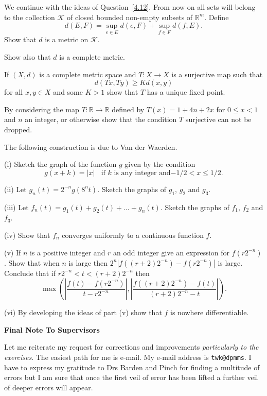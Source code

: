 \begin{question}
We continue with the ideas of Question~\ref{4.12}.
From now on all sets will belong to the collection
$\mathcal{K}$
of closed bounded non-empty subsets of ${\mathbb R}^{m}$.
Define
\[d(E,F)=\sup_{e\in E}d(e,F)+\sup_{f\in F}d(f,E).\]
Show that $d$ is a metric on $\mathcal{K}$.

Show also that $d$ is a complete metric.

\end{question}
\begin{question}\label{4.16} If $(X,d)$ is a complete metric
space and $T:X\rightarrow X$ is a surjective
map such that
\[d(Tx,Ty)\geq Kd(x,y)\]
for all $x,y\in X$ and some $K>1$ show that
$T$ has a unique fixed point.


By considering the map 
$T:{\mathbb R}\rightarrow{\mathbb R}$ defined by
$T(x)=1+4n+2x$ for $0\leq x<1$ and $n$ an integer,
or otherwise show that the condition $T$ surjective
can not be dropped.
\end{question}
\begin{question}
The following construction is due to Van der Waerden.

(i) Sketch the graph of the function $g$ given by the condition
\[g(x+k)=|x|\ \ \ \ \mbox{if $k$ is any integer and
$-1/2<x\leq 1/2$.}\]

(ii) Let $g_{n}(t)=2^{-n}g(8^{n}t)$. Sketch the graphs of
$g_{1}$, $g_{2}$ and $g_{3}$.

(iii) Let $f_{n}(t)=g_{1}(t)+g_{2}(t)+\ldots+g_{n}(t)$. Sketch the
graphs of $f_{1}$, $f_{2}$ and $f_{3}$.

(iv) Show that $f_{n}$ converges uniformly to a continuous function 
$f$.

(v) If $n$ is a positive integer and $r$ an odd integer give
an expression for $f(r2^{-n})$. Show that when $n$ is large
then $2^{n}|f((r+2)2^{-n})-f(r2^{-n})|$ is large.
Conclude that
if $r2^{-n}<t<(r+2)2^{-n}$ then
\[\max\left(\left|\frac{f(t)-f(r2^{-n})}{t-r2^{-n}}\right|,
\left|\frac{f((r+2)2^{-n})-f(t)}{(r+2)2^{-n}-t}\right|\right).\]

(vi) By developing the ideas of part (v) show that $f$ is
nowhere differentiable.
\end{question}
\begin{center}
{\bf Final Note To Supervisors}
\end{center}
Let me reiterate my request for corrections and improvements
\emph{particularly to the exercises}. The easiest
path for me is e-mail. My e-mail address is \verb+twk@dpmms+.
I have to express my gratitude to Drs Barden and Pinch
for finding a multitude of errors but I am sure that once the first
veil of error has been lifted a further veil of deeper errors
will appear.


